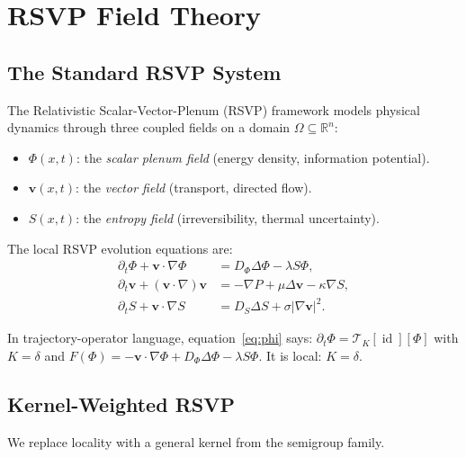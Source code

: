 \documentclass[12pt]{article}
\DeclareMathOperator{\id}{id}
\newcommand{\R}{\mathbb{R}}
\newcommand{\TK}{\mathcal{T}_K}
\begin{document}
\section{RSVP Field Theory}
\label{sec:rsvp}

\subsection{The Standard RSVP System}

The Relativistic Scalar-Vector-Plenum (RSVP) framework models physical
dynamics through three coupled fields on a domain $\Omega \subseteq \R^n$:
\begin{itemize}
  \item $\Phi(x,t)$: the \emph{scalar plenum field} (energy density, information potential).
  \item $\mathbf{v}(x,t)$: the \emph{vector field} (transport, directed flow).
  \item $S(x,t)$: the \emph{entropy field} (irreversibility, thermal uncertainty).
\end{itemize}

The local RSVP evolution equations are:
\begin{align}
  \partial_t \Phi + \mathbf{v}\cdot\nabla\Phi &= D_\Phi\Delta\Phi - \lambda S\Phi,
    \label{eq:phi} \\
  \partial_t\mathbf{v} + (\mathbf{v}\cdot\nabla)\mathbf{v} &=
    -\nabla P + \mu\Delta\mathbf{v} - \kappa\nabla S, \label{eq:v} \\
  \partial_t S + \mathbf{v}\cdot\nabla S &= D_S\Delta S + \sigma|\nabla\mathbf{v}|^2.
    \label{eq:S}
\end{align}

In trajectory-operator language, equation~\eqref{eq:phi} says:
$\partial_t\Phi = \TK[\id][\Phi]$ with $K = \delta$ and
$F(\Phi) = -\mathbf{v}\cdot\nabla\Phi + D_\Phi\Delta\Phi - \lambda S\Phi$.
It is local: $K = \delta$.

\subsection{Kernel-Weighted RSVP}

We replace locality with a general kernel from the semigroup family.
\end{document}
